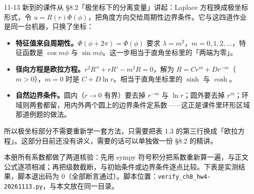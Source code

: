 \documentclass[11pt]{ctexart}
\let\orighdr\hdr
\renewcommand{\hdr}[2]{\par\needspace{7\baselineskip}\orighdr{#1}{#2}}
\begin{document}



\label{sec:bridge}

11-13 新到的课件从 §8.2「极坐标下的分离变量」讲起：Laplace 方程换成极坐标形式，令 $u=R(r)\Phi(\phi)$，把角度方向交给周期性边界条件。它与这四道作业是同一台机器，只换了坐标：

\begin{itemize}
  \item \textbf{特征值来自周期性。}$\Phi(\phi+2\pi)=\Phi(\phi)$ 要求 $\lambda=m^2$，$m=0,1,2,\dots$，特征函数是 $\cos m\phi$ 与 $\sin m\phi$。这一步相当于直角坐标里的「两端为零」。
  \item \textbf{径向方程是欧拉方程。}$r^2R''+rR'-m^2R=0$，解为 $R=C r^m+D r^{-m}$（$m>0$），$m=0$ 时是 $C+D\ln r$。相当于直角坐标里的 $\sinh$ 与 $\cosh$。
  \item \textbf{自然边界条件。}圆内（$r\to0$ 有界）要去掉 $r^{-m}$ 与 $\ln r$；圆外要去掉 $r^m$；环域则两套都留，用内外两个圆上的边界条件定系数——这正是课件里环形区域那道例题的做法。
\end{itemize}

所以极坐标部分不需要重新学一套方法，只需要把表 1.3 的第三行换成「欧拉方程」。这部分目前还没有讲义，需要的话可以单独做一份 §8.2 的精讲。

\label{sec:appA}

本册所有系数都做了两道核验：先用 sympy 符号积分把系数重新算一遍，与正文公式逐项相减；再把级数截断，与初始条件或边界条件逐点比较。下表是实测结果，脚本退出码为 $0$（全部断言通过）。脚本位置：\texttt{verify\_ch8\_hw4-20261113.py}，与本文放在同一目录。
\end{document}
